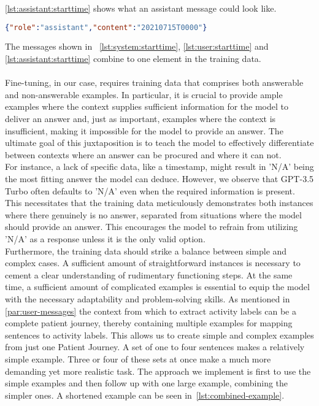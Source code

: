 \autoref{lst:assistant:starttime} shows what an assistant message could look like.
\begin{lstlisting}[language=json, caption={Assistant message for determining an activities start timestamp}, label={lst:assistant:starttime}]
{"role":"assistant","content":"20210715T0000"}
\end{lstlisting}

The messages shown in ~\autoref{lst:system:starttime}, \ref{lst:user:starttime} and \ref{lst:assistant:starttime} combine to one element in the training data.\\\\

Fine-tuning, in our case, requires training data that comprises both answerable and non-answerable examples. In particular, it is crucial to provide ample examples where the context supplies sufficient information for the model to deliver an answer and, just as important, examples where the context is insufficient, making it impossible for the model to provide an answer. The ultimate goal of this juxtaposition is to teach the model to effectively differentiate between contexts where an answer can be procured and where it can not.\\
For instance, a lack of specific data, like a timestamp, might result in 'N/A' being the most fitting answer the model can deduce. However, we observe that GPT-3.5 Turbo often defaults to 'N/A' even when the required information is present. This necessitates that the training data meticulously demonstrates both instances where there genuinely is no answer, separated from situations where the model should provide an answer. This encourages the model to refrain from utilizing 'N/A' as a response unless it is the only valid option.\\
Furthermore, the training data should strike a balance between simple and complex cases. A sufficient amount of straightforward instances is necessary to cement a clear understanding of rudimentary functioning steps. At the same time, a sufficient amount of complicated examples is essential to equip the model with the necessary adaptability and problem-solving skills. As mentioned in \ref{par:user-messages} the context from which to extract activity labels can be a complete patient journey, thereby containing multiple examples for mapping sentences to activity labels. This allows us to create simple and complex examples from just one Patient Journey. A set of one to four sentences makes a relatively simple example. Three or four of these sets at once make a much more demanding yet more realistic task. The approach we implement is first to use the simple examples and then follow up with one large example, combining the simpler ones. A shortened example can be seen in~\autoref{lst:combined-example}.
